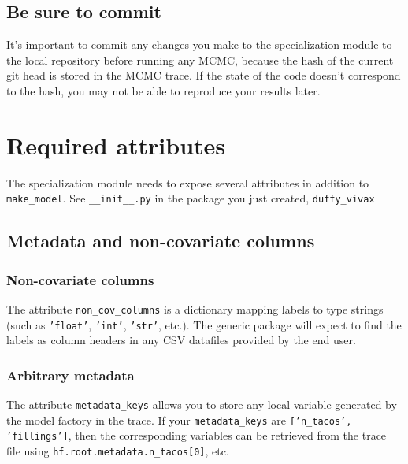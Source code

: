 \subsection{Be sure to commit}
\label{sub:git-commit} 
It's important to commit any changes you make to the specialization module to the local repository before running any MCMC, because the hash of the current git head is stored in the MCMC trace. If the state of the code doesn't correspond to the hash, you may not be able to reproduce your results later.

\section{Required attributes}

The specialization module needs to expose several attributes in addition to \texttt{make\_model}. See \texttt{\_\_init\_\_.py} in the package you just created, \texttt{duffy\_vivax}

\subsection{Metadata and non-covariate columns}
\subsubsection{Non-covariate columns} 
The attribute \texttt{non\_cov\_columns} is a dictionary mapping labels to type strings (such as \texttt{'float'}, \texttt{'int'}, \texttt{'str'}, etc.). The generic package will expect to find the labels as column headers in any CSV datafiles provided by the end user. 
\subsubsection{Arbitrary metadata} 
The attribute \texttt{metadata\_keys} allows you to store any local variable generated by the model factory in the trace. If your \texttt{metadata\_keys} are \texttt{['n\_tacos', 'fillings']}, then the corresponding variables can be retrieved from the trace file using \texttt{hf.root.metadata.n\_tacos[0]}, etc.

